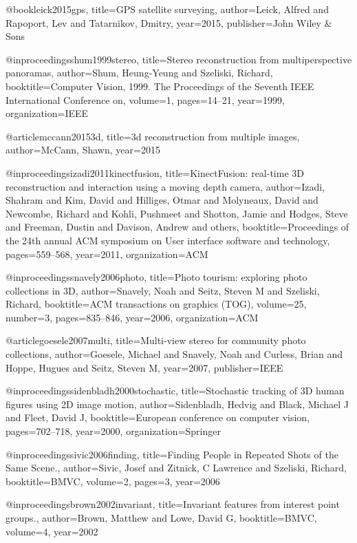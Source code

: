@book{leick2015gps,
  title={GPS satellite surveying},
  author={Leick, Alfred and Rapoport, Lev and Tatarnikov, Dmitry},
  year={2015},
  publisher={John Wiley \& Sons}
}

@inproceedings{shum1999stereo,
  title={Stereo reconstruction from multiperspective panoramas},
  author={Shum, Heung-Yeung and Szeliski, Richard},
  booktitle={Computer Vision, 1999. The Proceedings of the Seventh IEEE International Conference on},
  volume={1},
  pages={14--21},
  year={1999},
  organization={IEEE}
}

@article{mccann20153d,
  title={3d reconstruction from multiple images},
  author={McCann, Shawn},
  year={2015}
}

@inproceedings{izadi2011kinectfusion,
  title={KinectFusion: real-time 3D reconstruction and interaction using a moving depth camera},
  author={Izadi, Shahram and Kim, David and Hilliges, Otmar and Molyneaux, David and Newcombe, Richard and Kohli, Pushmeet and Shotton, Jamie and Hodges, Steve and Freeman, Dustin and Davison, Andrew and others},
  booktitle={Proceedings of the 24th annual ACM symposium on User interface software and technology},
  pages={559--568},
  year={2011},
  organization={ACM}
}

@inproceedings{snavely2006photo,
  title={Photo tourism: exploring photo collections in 3D},
  author={Snavely, Noah and Seitz, Steven M and Szeliski, Richard},
  booktitle={ACM transactions on graphics (TOG)},
  volume={25},
  number={3},
  pages={835--846},
  year={2006},
  organization={ACM}
}

@article{goesele2007multi,
  title={Multi-view stereo for community photo collections},
  author={Goesele, Michael and Snavely, Noah and Curless, Brian and Hoppe, Hugues and Seitz, Steven M},
  year={2007},
  publisher={IEEE}
}

@inproceedings{sidenbladh2000stochastic,
  title={Stochastic tracking of 3D human figures using 2D image motion},
  author={Sidenbladh, Hedvig and Black, Michael J and Fleet, David J},
  booktitle={European conference on computer vision},
  pages={702--718},
  year={2000},
  organization={Springer}
}

@inproceedings{sivic2006finding,
  title={Finding People in Repeated Shots of the Same Scene.},
  author={Sivic, Josef and Zitnick, C Lawrence and Szeliski, Richard},
  booktitle={BMVC},
  volume={2},
  pages={3},
  year={2006}
}

@inproceedings{brown2002invariant,
  title={Invariant features from interest point groups.},
  author={Brown, Matthew and Lowe, David G},
  booktitle={BMVC},
  volume={4},
  year={2002}
}

